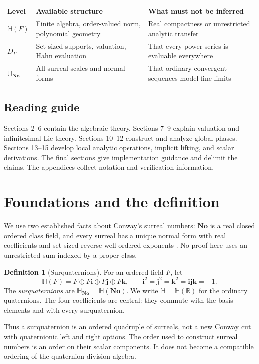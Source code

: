 \documentclass[11pt,letterpaper]{article}
\theoremstyle{definition}
\newtheorem{definition}[theorem]{Definition}
\newcommand{\No}{\mathbf{No}}
\newcommand{\R}{\mathbb R}
\newcommand{\HH}{\mathbb H}
\newcommand{\SQ}{\mathbb H_{\No}}
\newcommand{\ii}{\mathbf i}
\newcommand{\jj}{\mathbf j}
\newcommand{\kk}{\mathbf k}
\begin{document}
\begin{center}
\begin{tabular}{@{}>{\raggedright\arraybackslash}p{.22\linewidth}>{\raggedright\arraybackslash}p{.33\linewidth}>{\raggedright\arraybackslash}p{.36\linewidth}@{}}
\toprule
Level & Available structure & What must not be inferred \\
\midrule
$\HH(F)$ & Finite algebra, order-valued norm, polynomial geometry & Real compactness or unrestricted analytic transfer \\
$D_\Gamma$ & Set-sized supports, valuation, Hahn evaluation & That every power series is evaluable everywhere \\
$\SQ$ & All surreal scales and normal forms & That ordinary convergent sequences model fine limits \\
\bottomrule
\end{tabular}
\end{center}

\subsection{Reading guide}
Sections 2--6 contain the algebraic theory. Sections 7--9 explain valuation and
infinitesimal Lie theory. Sections 10--12 construct and analyze global phases.
Sections 13--15 develop local analytic operations, implicit lifting, and scalar
derivations. The final sections give implementation guidance and delimit the
claims. The appendices collect notation and verification information.

\section{Foundations and the definition}
\label{sec:foundations}
We use two established facts about Conway's surreal numbers: $\No$ is a real
closed ordered class field, and every surreal has a unique normal form with
real coefficients and set-sized reverse-well-ordered exponents
\cite{conway,gonshor,ek}. No proof here uses an unrestricted sum indexed by a
proper class.

\begin{definition}[Surquaternions]
For an ordered field $F$, let
\[
 \HH(F)=F\oplus F\ii\oplus F\jj\oplus F\kk,
 \qquad \ii^2=\jj^2=\kk^2=\ii\jj\kk=-1.
\]
The \emph{surquaternions} are $\SQ=\HH(\No)$. We write $\HH=\HH(\R)$ for the
ordinary quaternions. The four coefficients are central: they commute with the
basis elements and with every surquaternion.
\end{definition}
Thus a surquaternion is an ordered quadruple of surreals, not a new Conway cut
with quaternionic left and right options. The order used to construct surreal
numbers is an order on their scalar components. It does not become a compatible
ordering of the quaternion division algebra.
\end{document}

